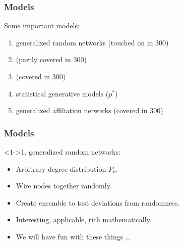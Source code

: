 \begin{frame}
  \frametitle{Models}

  \begin{block}{Some important models:}
    \begin{enumerate}
    \item<2-> generalized random networks \alert{(touched on in 300)}
    \item<3->
       \alert{(partly covered in 300)}
    \item<4->  \alert{(covered in 300)}
    \item<5-> statistical generative models ($p^\ast$)
    \item<6-> generalized affiliation networks \alert{(covered in 300)}
    \end{enumerate}
  \end{block}
  
\end{frame}

\begin{frame}
  \showtarotcards{0.35}{
    john-dory,
    overview,
    complex-networks,
    random-networks,
}
\end{frame}


\begin{frame}
  \frametitle{Models}

  \begin{block}<1->{1. generalized random networks:}
    \begin{itemize}
    \item<2-> Arbitrary degree distribution $P_k$.
    \item<3-> Wire nodes together randomly.
    \item<4-> Create ensemble to test deviations from randomness.
    \item<5-> Interesting, applicable, rich mathematically.
    \item<6->
      We will have fun with these things \ldots
    \end{itemize}
  \end{block}
  
\end{frame}

\begin{frame}
  \showtarotcards{0.35}{
    john-dory,
    overview,
    complex-networks,
    random-networks,
    scale-free-networks,
}
\end{frame}


